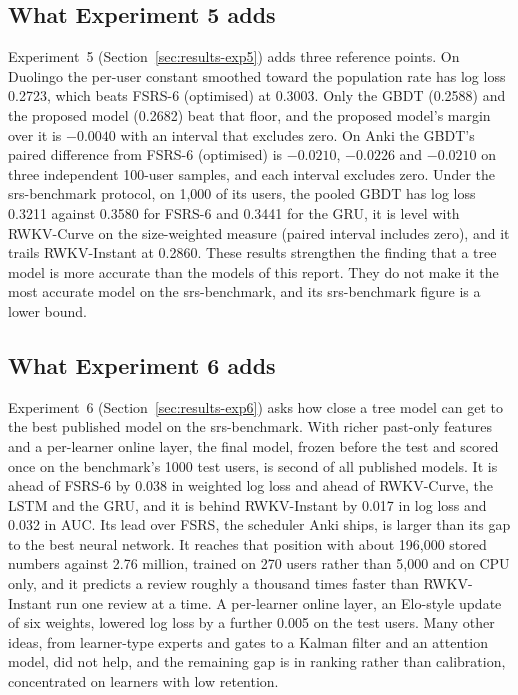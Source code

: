 \subsection*{What Experiment 5 adds}

Experiment~5 (Section~\ref{sec:results-exp5}) adds three reference points. On Duolingo the per-user constant smoothed toward the population rate has log loss 0.2723, which beats FSRS-6 (optimised) at 0.3003. Only the GBDT (0.2588) and the proposed model (0.2682) beat that floor, and the proposed model's margin over it is $-0.0040$ with an interval that excludes zero. On Anki the GBDT's paired difference from FSRS-6 (optimised) is $-0.0210$, $-0.0226$ and $-0.0210$ on three independent 100-user samples, and each interval excludes zero. Under the srs-benchmark protocol, on 1,000 of its users, the pooled GBDT has log loss 0.3211 against 0.3580 for FSRS-6 and 0.3441 for the GRU, it is level with RWKV-Curve on the size-weighted measure (paired interval includes zero), and it trails RWKV-Instant at 0.2860. These results strengthen the finding that a tree model is more accurate than the models of this report. They do not make it the most accurate model on the srs-benchmark, and its srs-benchmark figure is a lower bound.

\subsection*{What Experiment 6 adds}

Experiment~6 (Section~\ref{sec:results-exp6}) asks how close a tree model can get to the best published model on the
srs-benchmark. With richer past-only features and a per-learner online layer, the final model, frozen before the test and scored once on the benchmark's
1000 test users, is second of all published models. It is ahead of FSRS-6 by 0.038 in weighted log loss and ahead of RWKV-Curve,
the LSTM and the GRU, and it is behind RWKV-Instant by 0.017 in log loss and 0.032 in AUC. Its lead over FSRS, the scheduler
Anki ships, is larger than its gap to the best neural network. It reaches that position with about 196,000 stored numbers
against 2.76 million, trained on 270 users rather than 5,000 and on CPU only, and it predicts a review roughly a thousand
times faster than RWKV-Instant run one review at a time. A per-learner online layer, an Elo-style update of six weights,
lowered log loss by a further 0.005 on the test users. Many other ideas, from learner-type experts and gates to a Kalman filter and an
attention model, did not help, and the remaining gap is in ranking rather than calibration, concentrated on learners with low
retention.

